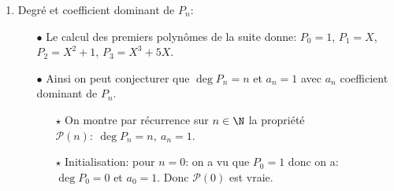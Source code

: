 \documentclass[a4paper, 11pt,reqno]{article}
\begin{document}
\begin{correction}
\begin{enumerate}
\begin{itemize}
\begin{itemize}
				            \item[$\star$]
				                  On d\'erive $f^{(n)}$ et on obtient pour tout $x\in I$:
				                  $$\begin{array}{lll}
						                  f^{(n+1)}(x) & = & \ddp\frac{ P_n^{\prime}(\sin{x})\cos{x}\times\cos^{n+1}{x}-(n+1)P_n(\sin{x})\cos^n{(x)}(-\sin{x})       }{ \cos^{2n+2}{x} }\vsec \\
						                               & = & \ddp\frac{\cos^n{x}\left( P_n^{\prime}(\sin{x})\cos^2{(x)}+(n+1)P_n(\sin{x})\sin{x}         \right)}{\cos^{2n+2}{(x)}}\vsec      \\
						                               & = & \ddp\frac{   P_n^{\prime}(\sin{x})(1-\sin^2{x})+(n+1)P_n(\sin{x})\sin{x}     }{\cos^{n+2}{x}}.
					                  \end{array}$$
				                  Ainsi, si on pose
				                  $$P_{n+1}=(1-X^2)P_n^{\prime}+(n+1)XP_n,$$
				                  $P_{n+1}$ est bien un polyn\^ome comme somme de polyn\^omes.
				            \item[$\star$] Cette fonction $f^{(n+1)}$ est bien continue sur $I$ et donc $f$ est bien de classe $C^{n+1}$ sur $I$.
			            \end{itemize}
			            Ainsi $\mathcal{P}(n+1)$ est vraie.
			      \item[$\bullet$] Conclusion: il r\'esulte du principe de r\'ecurrence que pour tout $n\in\N$, il existe un polyn\^ome $P_n$ tel que
			            $$\forall x\in I,\quad f^{(n)}(x)=\ddp\frac{P_n(x)}{(\cos{x})^{n+1}}.$$
		      \end{itemize}
		\item Degr\'e et coefficient dominant de $P_n$:
		      \begin{itemize}
			      \item[$\bullet$] Le calcul des premiers polyn\^{o}mes de la suite donne: $P_0=1$, $P_1=X$, $P_2=X^2+1$, $P_3=X^3+5X$.
			      \item[$\bullet$] Ainsi on peut conjecturer que $\deg{P_n}=n$ et $a_n=1$ avec $a_n$ coefficient dominant de $P_n$.
			            \begin{itemize}
				            \item[$\star$] On montre par r\'ecurrence sur $n\in\N$ la propri\'et\'e $\mathcal{P}(n):\ \deg{P_n}=n,\ a_n=1$.
				            \item[$\star$] Initialisation: pour $n=0$: on a vu que $P_0=1$ donc on a: $\deg{P_0}=0$ et $a_0=1$. Donc $\mathcal{P}(0)$ est vraie.

\end{itemize}
\end{itemize}
\end{enumerate}
\end{correction}
\end{document}
